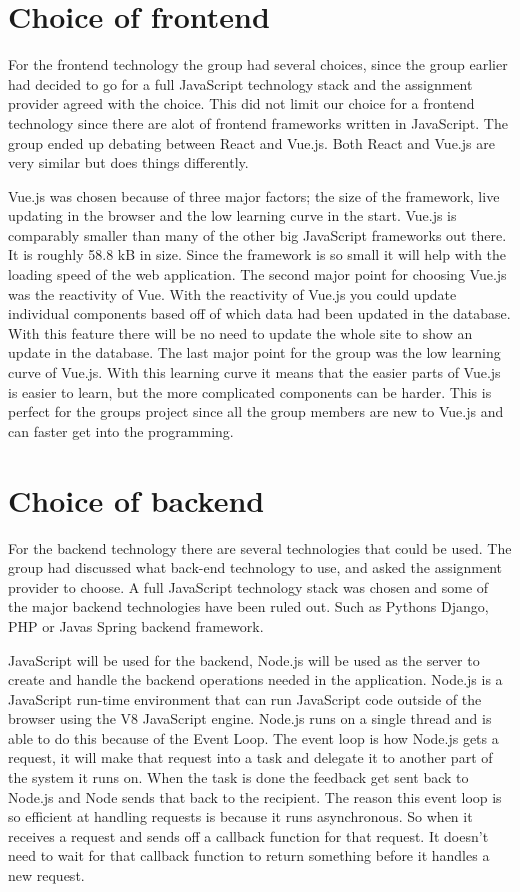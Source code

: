 \section{Choice of frontend} 
For the frontend technology the group had several choices, since the group earlier had decided to go for a full JavaScript technology stack and the assignment provider agreed with the choice. This did not limit our choice for a frontend technology since there are alot of frontend frameworks written in JavaScript. The group ended up debating between React and Vue.js. Both React and Vue.js are very similar but does things differently. 

Vue.js was chosen because of three major factors; the size of the framework, live updating in the browser and the low learning curve in the start. Vue.js is comparably smaller than many of the other big JavaScript frameworks out there. It is roughly 58.8 kB in size. Since the framework is so small it will help with the loading speed of the web application. The second major point for choosing Vue.js was the reactivity of Vue. With the reactivity of Vue.js you could update individual components based off of which data had been updated in the database. With this feature there will be no need to update the whole site to show an update in the database. The last major point for the group was the low learning curve of Vue.js. With this learning curve it means that the easier parts of Vue.js is easier to learn, but the more complicated components can be harder. This is perfect for the groups project since all the group members are new to Vue.js and can faster get into the programming.

\section{Choice of backend}
For the backend technology there are several technologies that could be used. The group had discussed what back-end technology to use, and asked the assignment provider to choose. A full JavaScript technology stack was chosen and some of the major backend technologies have been ruled out. Such as Pythons Django, PHP or Javas Spring backend framework. 

JavaScript will be used for the backend, Node.js will be used as the server to create and handle the backend operations needed in the application. Node.js is a JavaScript run-time environment that can run JavaScript code outside of the browser using the V8 JavaScript engine. Node.js runs on a single thread and is able to do this because of the Event Loop. The event loop is how Node.js gets a request, it will make that request into a task and delegate it to another part of the system it runs on. When the task is done the feedback get sent back to Node.js and Node sends that back to the recipient. The reason this event loop is so efficient at handling requests is because it runs asynchronous. So when it receives a request and sends off a callback function for that request. It doesn't need to wait for that callback function to return something before it handles a new request.

